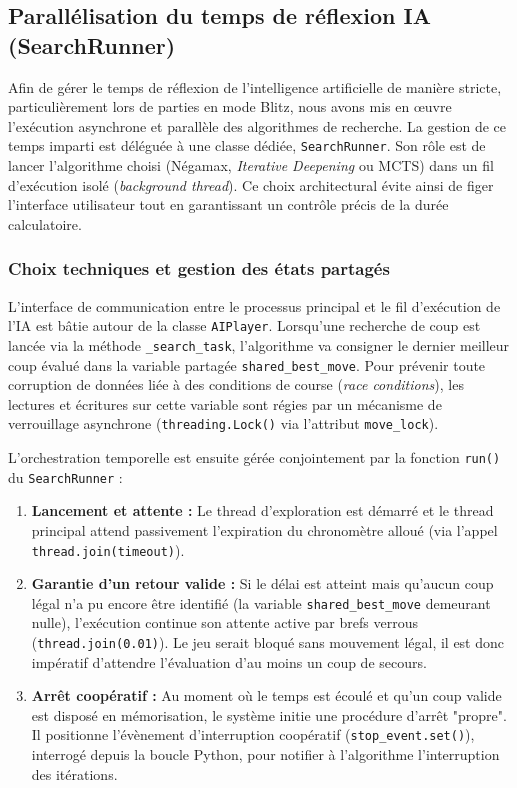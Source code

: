 \documentclass[a4paper]{article}
\begin{document}
\subsection{Parallélisation du temps de réflexion IA (SearchRunner)}

Afin de gérer le temps de réflexion de l'intelligence artificielle de manière stricte, particulièrement lors de parties en mode Blitz, nous avons mis en œuvre l'exécution asynchrone et parallèle des algorithmes de recherche. La gestion de ce temps imparti est déléguée à une classe dédiée, \texttt{SearchRunner}. Son rôle est de lancer l'algorithme choisi (Négamax, \textit{Iterative Deepening} ou MCTS) dans un fil d'exécution isolé (\textit{background thread}). Ce choix architectural évite ainsi de figer l'interface utilisateur tout en garantissant un contrôle précis de la durée calculatoire.

\subsubsection*{Choix techniques et gestion des états partagés}

L'interface de communication entre le processus principal et le fil d'exécution de l'IA est bâtie autour de la classe \texttt{AIPlayer}. Lorsqu'une recherche de coup est lancée via la méthode \texttt{\_search\_task}, l'algorithme va consigner le dernier meilleur coup évalué dans la variable partagée \texttt{shared\_best\_move}. Pour prévenir toute corruption de données liée à des conditions de course (\textit{race conditions}), les lectures et écritures sur cette variable sont régies par un mécanisme de verrouillage asynchrone (\texttt{threading.Lock()} via l'attribut \texttt{move\_lock}).

L'orchestration temporelle est ensuite gérée conjointement par la fonction \texttt{run()} du \texttt{SearchRunner} :
\begin{enumerate}
    \item \textbf{Lancement et attente :} Le thread d'exploration est démarré et le thread principal attend passivement l'expiration du chronomètre alloué (via l'appel \texttt{thread.join(timeout)}).
    \item \textbf{Garantie d'un retour valide :} Si le délai est atteint mais qu'aucun coup légal n'a pu encore être identifié (la variable \texttt{shared\_best\_move} demeurant nulle), l'exécution continue son attente active par brefs verrous (\texttt{thread.join(0.01)}). Le jeu serait bloqué sans mouvement légal, il est donc impératif d'attendre l'évaluation d'au moins un coup de secours.
    \item \textbf{Arrêt coopératif :} Au moment où le temps est écoulé et qu'un coup valide est disposé en mémorisation, le système initie une procédure d'arrêt "propre". Il positionne l'évènement d'interruption coopératif (\texttt{stop\_event.set()}), interrogé depuis la boucle Python, pour notifier à l'algorithme l'interruption des itérations.
\end{enumerate}
\end{document}
